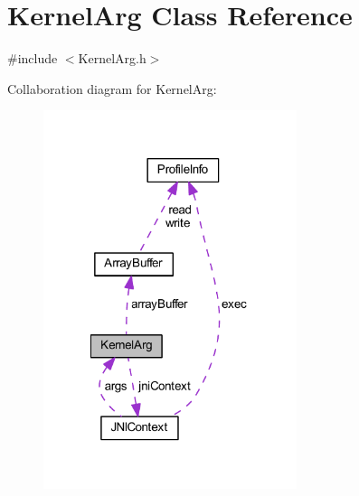\hypertarget{class_kernel_arg}{\section{Kernel\-Arg Class Reference}
\label{class_kernel_arg}
}


{\ttfamily \#include $<$Kernel\-Arg.\-h$>$}



Collaboration diagram for Kernel\-Arg\-:
\nopagebreak
\begin{figure}[H]
\begin{center}
\leavevmode
\includegraphics[width=210pt]{class_kernel_arg__coll__graph}
\end{center}
\end{figure}
